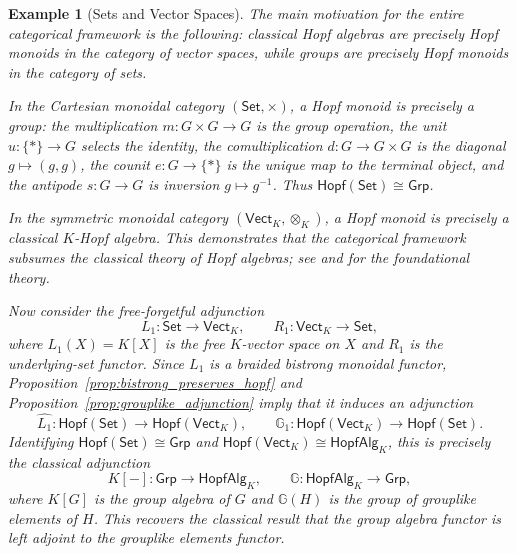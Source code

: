 \documentclass{amsart}
\newcommand{\Set}{\mathsf{Set}}
\newcommand{\Vect}{\mathsf{Vect}}
\newcommand{\Grp}{\mathsf{Grp}}
\newcommand{\HopfAlg}{\mathsf{HopfAlg}}
\newcommand{\VectK}{\Vect_K}
\newtheorem{example}{Example}[section]
\begin{document}
\begin{example}[Sets and Vector Spaces]\label{ex:set_vect}
The main motivation for the entire categorical framework is the following: classical Hopf algebras are precisely Hopf monoids in the category of vector spaces, while groups are precisely Hopf monoids in the category of sets.

In the Cartesian monoidal category $(\Set,\times)$, a Hopf monoid is precisely a group: the multiplication $m:G\times G\to G$ is the group operation, the unit $u:\{*\}\to G$ selects the identity, the comultiplication $d:G\to G\times G$ is the diagonal $g\mapsto(g,g)$, the counit $e:G\to\{*\}$ is the unique map to the terminal object, and the antipode $s:G\to G$ is inversion $g\mapsto g^{-1}$. Thus $\mathsf{Hopf}(\Set)\cong\Grp$.

In the symmetric monoidal category $(\VectK,\otimes_K)$, a Hopf monoid is precisely a classical $K$-Hopf algebra. This demonstrates that the categorical framework subsumes the classical theory of Hopf algebras; see \cite{Sweedler} and \cite{Abe} for the foundational theory.

Now consider the free-forgetful adjunction
\[
L_1:\Set\longrightarrow\VectK,\qquad R_1:\VectK\longrightarrow\Set,
\]
where $L_1(X)=K[X]$ is the free $K$-vector space on $X$ and $R_1$ is the underlying-set functor. Since $L_1$ is a braided bistrong monoidal functor, Proposition~\ref{prop:bistrong_preserves_hopf} and Proposition~\ref{prop:grouplike_adjunction} imply that it induces an adjunction
\[
\widehat{L_1}:\mathsf{Hopf}(\Set)\longrightarrow\mathsf{Hopf}(\VectK),\qquad
\mathbb{G}_1:\mathsf{Hopf}(\VectK)\longrightarrow\mathsf{Hopf}(\Set).
\]
Identifying $\mathsf{Hopf}(\Set)\cong\Grp$ and $\mathsf{Hopf}(\VectK)\cong\HopfAlg_K$, this is precisely the classical adjunction
\[
K[-]:\Grp\longrightarrow\HopfAlg_K,\qquad
\mathbb{G}:\HopfAlg_K\longrightarrow\Grp,
\]
where $K[G]$ is the group algebra of $G$ and $\mathbb{G}(H)$ is the group of grouplike elements of $H$. This recovers the classical result that the group algebra functor is left adjoint to the grouplike elements functor.
\end{example}
\end{document}
